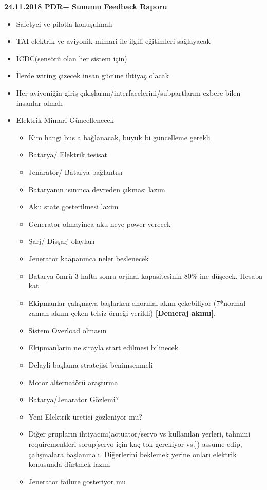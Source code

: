 \documentclass[a4paper,12pt]{article}
\begin{document}
	
\begin{center}
	\Large\textbf{24.11.2018 PDR+ Sunumu Feedback Raporu}
	\end{center}


\begin{itemize}

	\item Safetyci ve pilotla konuşulmalı
	
	\item TAI elektrik ve aviyonik mimari ile ilgili eğitimleri sağlayacak
	
	\item ICDC(sensörü olan her sistem için)
	
	\item İlerde wiring çizecek insan gücüne ihtiyaç olacak
	
	\item Her aviyoniğin giriş çıkışlarını/interfacelerini/subpartlarını ezbere bilen insanlar olmalı	
	
	

	\item Elektrik Mimari Güncellenecek
		\begin{itemize}
			\item Kim hangi bus a bağlanacak, büyük bi güncelleme gerekli
			\item Batarya/ Elektrik tesisat
			\item Jenarator/ Batarya bağlantısı
			\item Bataryanın ısınınca devreden çıkması lazım
			\item Aku state gosterilmesi laxim
			\item Generator olmayinca aku neye power verecek
			\item Şarj/ Disşarj olayları 
			\item Jenerator kaapanınca neler beslenecek
			\item Batarya ömrü 3 hafta sonra orjinal kapasitesinin 80\% ine düşecek. Hesaba kat
			\item Ekipmanlar çalışmaya başlarken anormal akım çekebiliyor (7*normal zaman akımı çeken telsiz örneği verildi) \textbf{[Demeraj akımı]}.
			\item Sistem Overload olmasın
			\item Ekipmanlarin ne sirayla start edilmesi bilinecek			
			\item Delayli başlama stratejisi benimsenmeli
			\item Motor alternatörü araştırma
			\item Batarya/Jenarator Gözlemi?
			\item Yeni Elektrik üretici gözleniyor mu?
			\item Diğer grupların ihtiyacını(actuator/servo vs kullanılan yerleri, tahmini requirementleri sorup[servo için kaç tok gerekiyor vs.]) assume edip, çalışmalara başlanmalı. Diğerlerini beklemek yerine onları elektrik konusunda dürtmek lazım
			\item Jenerator failure gosteriyor mu	
	

\end{itemize}
\end{itemize}
\end{document}
